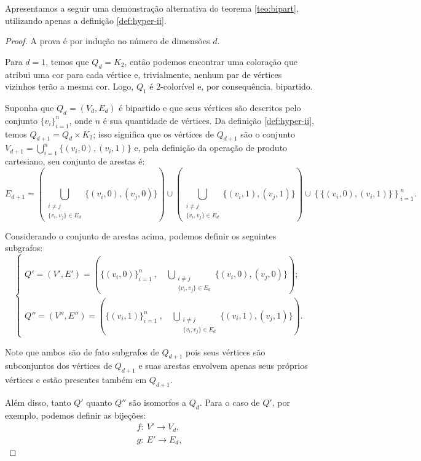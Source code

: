 \documentclass[12pt, a4paper]{article}
\begin{document}
Apresentamos a seguir uma demonstração alternativa do teorema \ref{teo:bipart}, utilizando apenas a definição \ref{def:hyper-ii}.

\begin{proof}
    A prova é por indução no número de dimensões $d$.

    Para $d=1$, temos que $Q_d = K_2$, então podemos encontrar uma coloração que atribui uma cor para cada vértice e, trivialmente, nenhum par de vértices vizinhos terão a mesma cor. Logo, $Q_1$ é 2-colorível e, por consequência, bipartido.

    Suponha que $Q_d = (V_d, E_d)$ é bipartido e que seus vértices são descritos pelo conjunto $\{v_i\}_{i=1}^{n}$, onde $n$ é sua quantidade de vértices. Da definição \ref{def:hyper-ii}, temos $Q_{d+1} = Q_d \times K_2$; isso significa que os vértices de $Q_{d+1}$ são o conjunto $V_{d+1} = \bigcup_{i=1}^{n}\{(v_i, 0), (v_i, 1)\}$ e, pela definição da operação de produto cartesiano, seu conjunto de arestas é:
    $$
    E_{d+1} = \left(\bigcup_{\substack{i\neq j \\ \{v_i, v_j\}\in E_d}} \{(v_i, 0), (v_j, 0)\}\right)\cup \left(\bigcup_{\substack{i\neq j \\ \{v_i, v_j\}\in E_d}} \{(v_i, 1), (v_j, 1)\}\right) \cup \left\{\{(v_i, 0), (v_i, 1)\}\right\}_{i=1}^{n}.
    $$
    
    Considerando o conjunto de arestas acima, podemos definir os seguintes subgrafos: 
    \begin{equation}\label{eq:subgrafos}
    \begin{cases}
        Q' = (V', E') = \left(\{(v_i, 0)\}_{i=1}^{n}\ , \quad \bigcup_{\substack{i\neq j \\ \{v_i, v_j\}\in E_d}} \{(v_i, 0), (v_j, 0)\}\right);\\
        Q'' = (V'', E'') = \left(\{(v_i, 1)\}_{i=1}^{n}\ , \quad \bigcup_{\substack{i\neq j \\ \{v_i, v_j\}\in E_d}} \{(v_i, 1), (v_j, 1)\}\right).
    \end{cases}
    \end{equation}
    
    Note que ambos são de fato subgrafos de $Q_{d+1}$ pois seus vértices são subconjuntos dos vértices de $Q_{d+1}$ e suas arestas envolvem apenas seus próprios vértices e estão presentes também em $Q_{d+1}$. 
    
    Além disso, tanto $Q'$ quanto $Q''$ são isomorfos a $Q_d$. Para o caso de $Q'$, por exemplo, podemos definir as bijeções:
    \begin{align*}
        f: \ V' \rightarrow V_d,\\
        g: \ E' \rightarrow E_d,
    \end{align*}


\end{proof}
\end{document}
